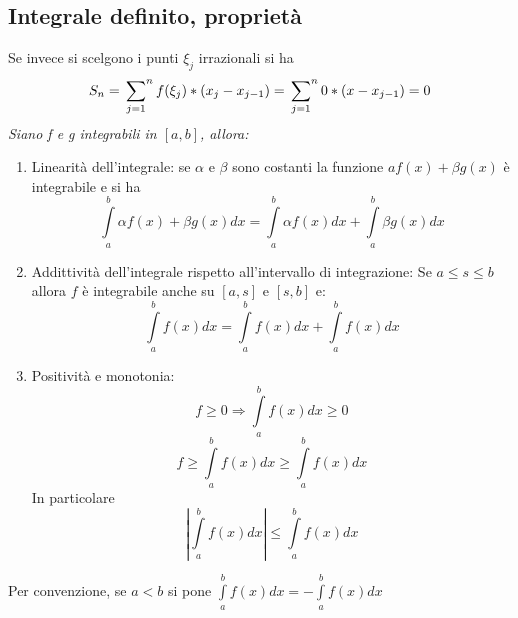 \documentclass{book}
\begin{document}
\subsection{Integrale definito, proprietà}
Se invece si scelgono i punti $\xi_j$ irrazionali si ha
\begin{equation*}
	S_n=\sideset{}{^n}\sum_{j=1}f(\xi_j)*(x_j-x_{j-1})=\sideset{}{^n}\sum_{j=1}0*(x-x_{j-1})=0
\end{equation*} 
\textit{Siano f e g integrabili in $[a,b]$, allora:}
\begin{enumerate}
	\item Linearità dell'integrale: se $\alpha$ e $\beta$ sono costanti la funzione $af(x)+\beta g(x)$ è integrabile e si ha
	\begin{equation*}
		\int\limits^b_a \alpha f(x)+\beta g(x)dx=\int\limits^b_a \alpha f(x)dx+\int\limits^b_a \beta g(x)dx
	\end{equation*}
	\item Addittività dell'integrale rispetto all'intervallo di integrazione: Se $a\leq s \leq b$ allora $f$ è integrabile anche su 
	$[a,s]$ e $[s,b]$ e:
	\begin{equation*}
		\int\limits^b_a f(x)dx=\int\limits^b_a f(x)dx+\int\limits^b_af(x)dx
	\end{equation*}
	\item Positività e monotonia:
	\begin{equation*}
		f\geq 0 \Rightarrow \int\limits^b_a f(x)dx\geq 0
	\end{equation*}
	\begin{equation*}
		f\geq \int\limits^b_a f(x)dx\geq \int\limits^b_a f(x)dx
	\end{equation*}
In particolare
\begin{equation*}
	| \int\limits^b_a f(x)dx |\leq \int\limits^b_a f(x)dx
\end{equation*}
\end{enumerate}
Per convenzione, se $a<b$ si pone $\int\limits^b_a f(x)dx=-\int\limits^b_a f(x)dx$
\end{document}
